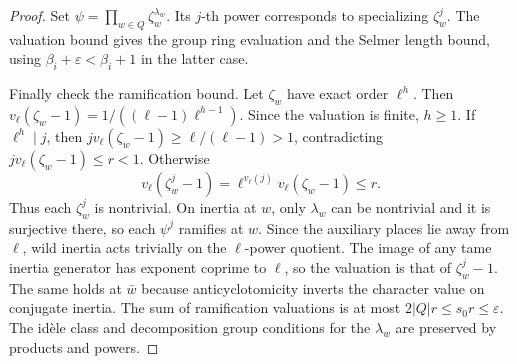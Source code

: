 \begin{proof}
Set $\psi=\prod_{w\in Q}\zeta_w^{\lambda_w}$. Its $j$-th power corresponds to specializing $\zeta_w^j$. The valuation bound gives the group ring evaluation and the Selmer length bound, using $\beta_i+\varepsilon<\beta_i+1$ in the latter case.

Finally check the ramification bound. Let $\zeta_w$ have exact order $\ell^h$. Then
$v_\ell(\zeta_w-1)=1/((\ell-1)\ell^{h-1})$. Since the valuation is finite, $h\ge1$. If $\ell^h\mid j$, then
$jv_\ell(\zeta_w-1)\ge\ell/(\ell-1)>1$, contradicting $jv_\ell(\zeta_w-1)\le r<1$. Otherwise
\[
 v_\ell(\zeta_w^j-1)
  =\ell^{v_\ell(j)}v_\ell(\zeta_w-1)\le r .
\]
Thus each $\zeta_w^j$ is nontrivial. On inertia at $w$, only $\lambda_w$ can be nontrivial and it is surjective there, so each $\psi^j$ ramifies at $w$. Since the auxiliary places lie away from $\ell$, wild inertia acts trivially on the $\ell$-power quotient. The image of any tame inertia generator has exponent coprime to $\ell$, so the valuation is that of $\zeta_w^j-1$. The same holds at $\bar w$ because anticyclotomicity inverts the character value on conjugate inertia. The sum of ramification valuations is at most $2|Q|r\le s_0r\le\varepsilon$. The idèle class and decomposition group conditions for the $\lambda_w$ are preserved by products and powers.
\end{proof}

